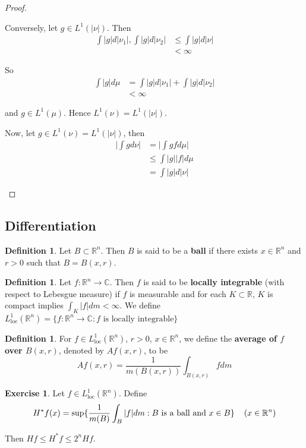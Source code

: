 \documentclass[12pt]{amsart}
\theoremstyle{definition}
\newtheorem{defn}[definition]{Definition}
\newtheorem{ex}[definition]{Exercise}
\newcommand{\C}{\mathbb{C}}
\newcommand{\R}{\mathbb{R}}
\newcommand{\Ll}{L^1_{\text{loc}}(\R^n)}
\begin{document}
\begin{proof}
\begin{enumerate}
			Conversely, let $g \in L^1(|\nu|)$. Then 
			\begin{align*}
				\int |g| d|\nu_1|, \int |g| d |\nu_2| 
				& \leq \int |g|d |\nu|\\
				& < \infty
			\end{align*}
			
			So 
			\begin{align*}
				\int |g| d\mu
				& =\int |g| d|\nu_1| + \int |g| d |\nu_2| \\
				& < \infty
			\end{align*}
			
			and $g \in L^1(\mu)$. Hence $L^1(\nu) = L^1(|\nu|)$. 
			
			Now, let $g \in L^1(\nu) = L^1(|\nu|)$, then 
			\begin{align*}
				\bigg| \int g d\nu \bigg| 
				&= \bigg| \int g f d\mu \bigg| \\
				& \leq \int |g||f|d\mu\\
				& = \int |g| d |\nu|
			\end{align*}
			
		\end{enumerate}
	\end{proof}

	
	\subsection{Differentiation}
	
	\begin{defn}
		Let $B \subset \R^n$. Then $B$ is said to be a \textbf{ball} if there exists $x \in \R^n$ and $r > 0$ such that $B = B(x, r)$. 
	\end{defn}
	
	\begin{defn}
		Let $f: \R^n \rightarrow \C$. Then $f$ is said to be \textbf{locally integrable} (with respect to Lebesgue measure) if $f$ is measurable and for each $K \subset \R$, $K$ is compact implies $\int_K |f| dm < \infty$. We define $L^1_{\text{loc}}(\R^n) = \{f:\R^n \rightarrow \C: f \text{ is locally integrable}\}$
	\end{defn}
	
	\begin{defn}
		For $f \in \Ll$, $r>0$, $x \in \R^n$, we define the \textbf{average of $f$ over $B(x,r)$}, denoted by $Af(x,r)$, to be $$Af(x,r) = \frac{1}{m(B(x,r))}\int_{B(x,r)}fdm$$
	\end{defn}
	
	\begin{ex}
		Let $f \in \Ll$. Define $$H^*f(x) = \sup\{\frac{1}{m(B)}\int_{B}|f|dm: B \text{ is a ball and } x \in B\} \hspace{4mm} (x \in \R^n)$$
		
		Then $Hf \leq H^*f \leq 2^n Hf$. 
	\end{ex}
	
\end{document}
